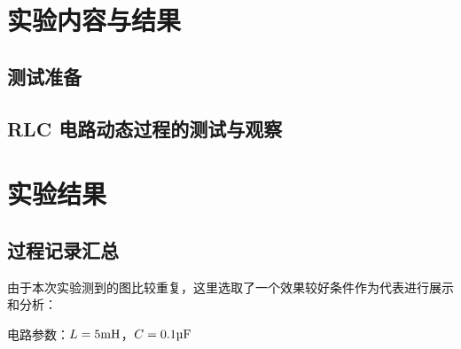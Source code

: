 \documentclass[a4paper,utf8]{article}
\begin{document}
\section{实验内容与结果}
    \subsection{测试准备}
    \subsection{RLC 电路动态过程的测试与观察}

\section{实验结果}
    \subsection{过程记录汇总}
    由于本次实验测到的图比较重复，这里选取了一个效果较好条件作为代表进行展示和分析：\par
    电路参数：$L= 5\unit{\mH}$，$C= 0.1\unit{\uF}$
    \newpage
\end{document}
